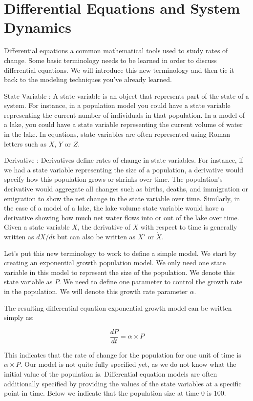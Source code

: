 \documentclass[]{memoir}
\begin{document}
\section{Differential Equations and System Dynamics}

Differential equations a common mathematical tools used to study rates
of change. Some basic terminology needs to be learned in order to
discuss differential equations. We will introduce this new terminology
and then tie it back to the modeling techniques you've already learned.

State Variable : A state variable is an object that represents part of
the state of a system. For instance, in a population model you could
have a state variable representing the current number of individuals in
that population. In a model of a lake, you could have a state variable
representing the current volume of water in the lake. In equations,
state variables are often represented using Roman letters such as $X$,
$Y$ or $Z$.

Derivative : Derivatives define rates of change in state variables. For
instance, if we had a state variable representing the size of a
population, a derivative would specify how this population grows or
shrinks over time. The population's derivative would aggregate all
changes such as births, deaths, and immigration or emigration to show
the net change in the state variable over time. Similarly, in the case
of a model of a lake, the lake volume state variable would have a
derivative showing how much net water flows into or out of the lake over
time. Given a state variable $X$, the derivative of $X$ with respect to
time is generally written as $dX/dt$ but can also be written as $X'$ or
$\dot{X}$.

Let's put this new terminology to work to define a simple model. We
start by creating an exponential growth population model. We only need
one state variable in this model to represent the size of the
population. We denote this state variable as $P$. We need to define one
parameter to control the growth rate in the population. We will denote
this growth rate parameter $\alpha$.

The resulting differential equation exponential growth model can be
written simply as:

\[ \frac{dP}{dt} = \alpha \times P \]

This indicates that the rate of change for the population for one unit
of time is $\alpha \times P$. Our model is not quite fully specified
yet, as we do not know what the initial value of the population is.
Differential equation models are often additionally specified by
providing the values of the state variables at a specific point in time.
Below we indicate that the population size at time 0 is 100.
\end{document}
